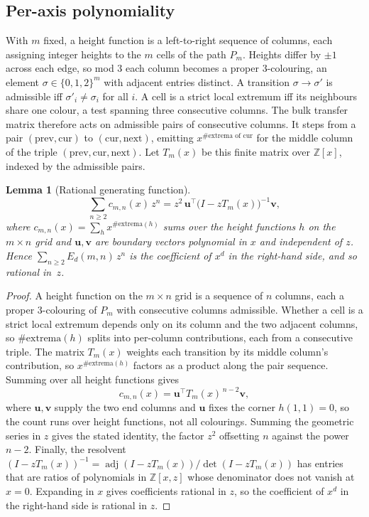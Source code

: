 \documentclass[11pt]{article}
\newtheorem{lemma}[theorem]{Lemma}
\theoremstyle{definition}
\theoremstyle{remark}
\newcommand{\Z}{\mathbb{Z}}
\begin{document}
\subsection{Per-axis polynomiality}

With $m$ fixed, a height function is a left-to-right sequence of columns, each assigning integer
heights to the $m$ cells of the path $P_m$. Heights differ by $\pm1$ across each edge, so mod $3$
each column becomes a proper $3$-colouring, an element $\sigma\in\{0,1,2\}^m$ with adjacent entries
distinct. A transition $\sigma\to\sigma'$ is admissible iff $\sigma'_i\ne\sigma_i$
for all $i$. A
cell is a strict local extremum iff its neighbours share one colour, a
test spanning three consecutive columns. The bulk transfer
matrix therefore acts on admissible pairs of consecutive columns. It steps from a
pair $(\text{prev},\text{cur})$ to $(\text{cur},\text{next})$, emitting
$x^{\#\text{extrema of cur}}$ for the middle column of the triple
$(\text{prev},\text{cur},\text{next})$. Let $T_m(x)$ be this finite matrix over $\Z[x]$, indexed by the admissible pairs.

\begin{lemma}[Rational generating function]\label{lem:ratGF}
\[
  \sum_{n\ge2} c_{m,n}(x)\,z^n=z^2\,\mathbf u^{\!\top}\big(I-zT_m(x)\big)^{-1}\mathbf v,
\]
where $c_{m,n}(x)=\sum_h x^{\#\text{extrema}(h)}$ sums over the height functions $h$
on the $m\times n$ grid and $\mathbf u,\mathbf v$ are boundary vectors polynomial in
$x$ and independent of $z$. Hence $\sum_{n\ge2} E_d(m,n)\,z^n$ is the coefficient of $x^d$ in the
right-hand side, and so rational in~$z$.
\end{lemma}

\begin{proof}
A height function on the $m\times n$ grid is a sequence of $n$ columns, each a
proper $3$-colouring of $P_m$ with consecutive columns admissible. Whether a cell is
a strict local extremum depends only on its column and the two adjacent columns, so
$\#\text{extrema}(h)$ splits into per-column contributions, each from a consecutive
triple. The matrix $T_m(x)$ weights each transition by its middle column's
contribution, so $x^{\#\text{extrema}(h)}$ factors as a product along the pair
sequence. Summing over all height functions gives
\[
  c_{m,n}(x)=\mathbf u^{\!\top}T_m(x)^{\,n-2}\mathbf v,
\]
where $\mathbf u,\mathbf v$ supply the two end columns and $\mathbf u$ fixes the
corner $h(1,1)=0$, so the count runs over height functions, not all colourings.
Summing the geometric series in $z$ gives the stated identity, the factor $z^2$
offsetting $n$ against the power $n-2$. Finally, the resolvent
$(I-zT_m(x))^{-1}=\operatorname{adj}(I-zT_m(x))/\det(I-zT_m(x))$ has entries that are
ratios of polynomials in $\Z[x,z]$ whose denominator does not vanish at $x=0$. Expanding in $x$
gives coefficients rational in $z$, so the coefficient of $x^d$ in the right-hand
side is rational in $z$.
\end{proof}
\end{document}
